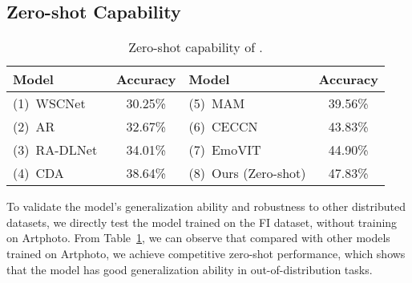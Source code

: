 \subsection{Zero-shot Capability}
% 



\begin{table}[t]
\centering
\caption{Zero-shot capability of \shortname.}
\label{tab:cap3}
\resizebox{1\linewidth}{!}
{
\begin{tabular}{lc|lc}
\hline
\textbf{Model} & \textbf{Accuracy} & \textbf{Model} & \textbf{Accuracy} \\ \hline
(1)~WSCNet~\cite{2019WSCNet}  & 30.25\% & (5)~MAM~\cite{zhang2024affective} & 39.56\%  \\ \hline
(2)~AR~\cite{2018Visual} & 32.67\% & (6)~CECCN~\cite{ruan2024color} & 43.83\% \\ \hline
(3)~RA-DLNet~\cite{2020A} & 34.01\%  & (7)~EmoVIT~\cite{xie2024emovit} & 44.90\% \\ \hline
(4)~CDA~\cite{han2023boosting} & 38.64\% & (8)~Ours (Zero-shot) & 47.83\% \\ \hline
\end{tabular}
}
\vspace{-5mm}
\end{table}


To validate the model's generalization ability and robustness to other distributed datasets, we directly test the model trained on the FI dataset, without training on Artphoto. 
From Table~\ref{tab:cap3}, we can observe that compared with other models trained on Artphoto, we achieve competitive zero-shot performance, which shows that the model has good generalization ability in out-of-distribution tasks.

